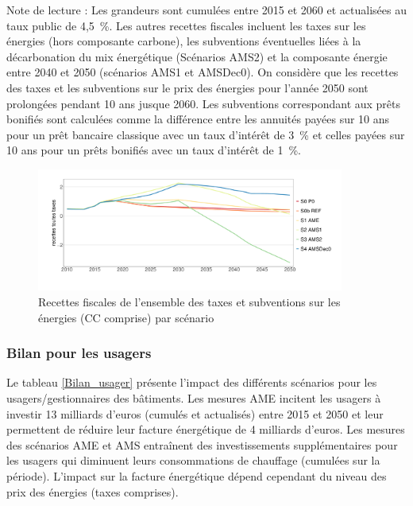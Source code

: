 \documentclass[10.5pt,a4paper]{article}
\begin{document}
{\begin{table}[h]
\footnotesize{Note de lecture : Les grandeurs sont cumulées entre 2015 et 2060 et actualisées au taux public de 4,5~\%.  Les autres recettes fiscales incluent les taxes sur les énergies (hors composante carbone), les subventions éventuelles liées à la décarbonation du mix énergétique (Scénarios AMS2) et la composante énergie entre 2040 et 2050 (scénarios AMS1 et AMSDec0). On considère que les recettes des taxes et les subventions sur le prix des énergies pour l'année 2050 sont prolongées pendant 10 ans jusque 2060. Les subventions correspondant aux prêts bonifiés sont calculées comme la différence entre les annuités payées sur 10 ans pour un prêt bancaire classique avec un taux d'intérêt de 3~\% et celles payées sur 10 ans pour un prêts bonifiés avec un taux d'intérêt de 1~\%.}
\end{table}

% 

\begin{figure}[h!]
\centering 
\caption{Recettes fiscales de l'ensemble des taxes et subventions sur les énergies (CC comprise) par scénario }\label{Evol_Recettes_taxes-1}  
\includegraphics[width = 0.9\textwidth]{Evol_Recettes_taxes-1}  
\end{figure}

\clearpage 

\subsubsection{Bilan pour les usagers}
%
Le tableau \ref{Bilan_usager} présente l'impact des différents scénarios pour les usagers/gestionnaires des bâtiments. Les mesures AME incitent les usagers à investir 13 milliards d'euros (cumulés et actualisés) entre 2015 et 2050 et leur permettent de réduire leur facture énergétique de 4 milliards d'euros. Les mesures des scénarios AME et AMS entraînent des investissements supplémentaires pour les usagers qui diminuent leurs consommations de chauffage (cumulées sur la période). L'impact sur la facture énergétique dépend cependant du niveau des prix des énergies (taxes comprises). 

}
\end{document}
